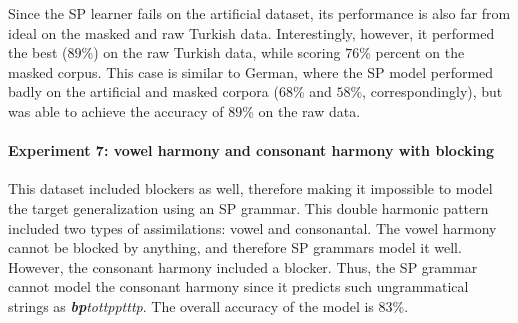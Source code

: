 \begin{table}[h!]
\centering
{}
\caption{SP learning of several harmonies with blockers; abstract representation.}
\end{table}


Since the SP learner fails on the artificial dataset, its performance is also far from ideal on the masked and raw Turkish data.
Interestingly, however, it performed the best ($89$\%) on the raw Turkish data, while scoring $76$\% percent on the masked corpus.
This case is similar to German, where the SP model performed badly on the artificial and masked corpora ($68$\% and $58$\%, correspondingly), but was able to achieve the accuracy of $89$\% on the raw data.




\paragraph{Experiment 7: vowel harmony and consonant harmony with blocking}

This dataset included blockers as well, therefore making it impossible to model the target generalization using an SP grammar.
This double harmonic pattern included two types of assimilations: vowel and consonantal.
The vowel harmony cannot be blocked by anything, and therefore SP grammars model it well.
However, the consonant harmony included a blocker.
Thus, the SP grammar cannot model the consonant harmony since it predicts such ungrammatical strings as \emph{\textbf{bp}tottpptttp}.
The overall accuracy of the model is $83$\%.

